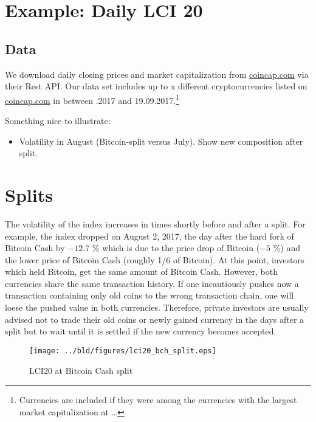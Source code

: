 \documentclass[11pt]{article}
\begin{document}
\section{Example: Daily LCI 20}

\subsection{Data}

We download daily closing prices and market capitalization from \href{https://coincap.com}{coincap.com} via their Rest API.
Our data set includes up to x different cryptocurrencies listed on \href{https://coincap.com}{coincap.com} in between .2017 and 19.09.2017.\footnote{Currencies are included if they were among the currencies with the largest market capitalization at \dots}


Something nice to illustrate:
\begin{itemize}
  \item Volatility in August (Bitcoin-split versus July). Show new composition after split.
\end{itemize}

\section{Splits}

The volatility of the index increases in times shortly before and after a split.
For example, the index dropped on August 2, 2017, the day after the hard fork of Bitcoin Cash by $-12.7$ \% which is due to the price drop of Bitcoin ($-5$ \%) and the lower price of Bitcoin Cash (roughly 1/6 of Bitcoin).
At this point, investors which held Bitcoin, get the same amount of Bitcoin Cash.
However, both currencies share the same transaction history.
If one incautiously pushes now a transaction containing only old coins to the wrong transaction chain, one will loese the pushed value in both currencies.
Therefore, private investors are usually advised not to trade their old coins or newly gained currency in the days after a split but to wait until it is settled if the new currency becomes accepted.


\begin{figure}%
    \centering%
    \texttt{[image: ../bld/figures/lci20\_bch\_split.eps]}%
    \caption{LCI20 at Bitcoin Cash split}\label{f:split}%
\end{figure}





\end{document}
